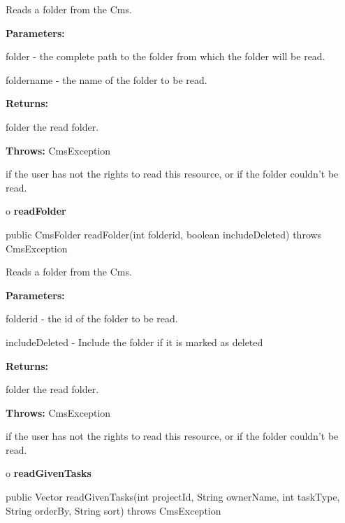 \begin{description}
\htmlDD Reads a folder from the Cms. 

\begin{description}
\item {\bf Parameters:}  

folder - the complete path to the folder from which the folder will be read.  

foldername - the name of the folder to be read.  
\item {\bf Returns:}  

folder the read folder.  
\item {\bf Throws:} CmsException  

if the user has not the rights to read this resource, or if the folder
couldn't be read.  
\end{description}

\end{description}

o {\bf readFolder} 

\begin{PRE}
 public CmsFolder readFolder(int folderid,
                             boolean includeDeleted) throws CmsException
\end{PRE}

\begin{description}
\htmlDD Reads a folder from the Cms. 

\begin{description}
\item {\bf Parameters:}  

folderid - the id of the folder to be read.  

includeDeleted - Include the folder if it is marked as deleted  
\item {\bf Returns:}  

folder the read folder.  
\item {\bf Throws:} CmsException  

if the user has not the rights to read this resource, or if the folder
couldn't be read.  
\end{description}

\end{description}

o {\bf readGivenTasks} 

\begin{PRE}
 public Vector readGivenTasks(int projectId,
                              String ownerName,
                              int taskType,
                              String orderBy,
                              String sort) throws CmsException
\end{PRE}


